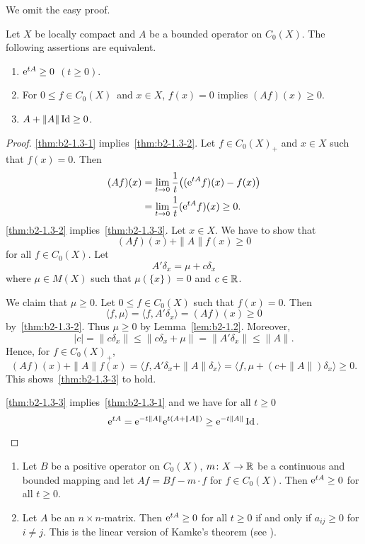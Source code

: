 We omit the easy proof.
\begin{theorem}\label{thm:b2-1.3}
Let $X$ be locally compact and $A$ be a bounded operator on $C_{0}(X)$.
The following assertions are equivalent.
\begin{enumerate}[\upshape (a)]
\item \label{thm:b2-1.3-1}
$\eu^{tA} \geq 0$ $(t \geq 0)$.
\item \label{thm:b2-1.3-2}
For  $0 \leq f \in C_{0}(X)$\, and  $x \in X$,  $f(x) = 0$ implies $(Af)(x) \geq 0$.
\item \label{thm:b2-1.3-3}
$A + \|A\|\Id \geq 0$.
\end{enumerate}
\end{theorem}
\begin{proof}
\ref{thm:b2-1.3-1} implies~\ref{thm:b2-1.3-2}.
Let $f \in C_{0}(X)_{+}$ and $x \in X$ such that $f(x) = 0$.
Then
\begin{align*}
(Af)(x) &= \lim_{t \to 0} \frac{1}{t} \bigl( (\eu^{tA}f)(x) - f(x) \bigr) \\
&= \lim_{t \to 0}\frac{1}{t} (\eu^{tA}f)(x) \geq 0 .
\end{align*}
\ref{thm:b2-1.3-2} implies~\ref{thm:b2-1.3-3}.
Let $x \in X$.
We have to show that 
%
\[
	(Af)(x) + \|A\|f(x) \geq 0
\]
%
for all $f \in C_{0}(X)$.
Let 
%
\[
	A'\delta_{x} = \mu + c\delta_{x}
\]
%
where $\mu \in M(X)$ such that $\mu(\{x\}) = 0$ and $c \in \mathbb{R}$.

We claim that $\mu \geq 0$.
Let $0 \leq f \in C_{0}(X)$ such that $f(x) = 0$.
Then 
%
\[
	\langle f,\mu \rangle = \langle f,A'\delta_{x} \rangle = (Af)(x) \geq 0 
\]
%
by~\ref{thm:b2-1.3-2}.
Thus $\mu \geq 0$ by Lemma~\ref{lem:b2-1.2}.
Moreover, 
%
\[
	|c| = \|c\delta_{x}\| \leq \|c\delta_{x} + \mu\| = \|A'\delta_{x}\| \leq \|A\| .
\]
%
Hence, for $f \in C_{0}(X)_{+}$,
\[
(Af)(x) + \|A\|f(x) = \langle f, A'\delta_{x} + \|A\|\delta_{x} \rangle = \langle f, \mu + (c+\|A\|)\delta_{x} \rangle \geq 0.
\]
This shows~\ref{thm:b2-1.3-3} to hold.

\ref{thm:b2-1.3-3} implies~\ref{thm:b2-1.3-1} and we have for all $t \geq 0$
%
\begin{equation*}
	\eu^{tA} = \eu^{-t\|A\|}\eu^{t(A+\|A\|)} \geq \eu^{-t\|A\|}\Id .
	\qedhere
\end{equation*}
%
\end{proof}
\begin{example}\label{ex:b2-1.4} 
 
\begin{enumerate}[\upshape (i), wide, labelindent=.5ex] 
\item \label{ex:b2-1.4-1}
Let $B$ be a positive operator on $C_{0}(X)$, $m \colon X \to \mathbb{R}$ be a continuous and bounded mapping and let $Af = Bf - m \cdot f$ for $f \in C_{0}(X)$.
Then $\eu^{tA} \geq 0$ for all $t \geq 0$.
		
\item \label{ex:b2-1.4-2}
Let $A$ be an $n \times n$-matrix.
Then $\eu^{tA} \geq 0$ for all $t \geq 0$ if and only if\/ $a_{ij} \geq 0$ for $i \neq j$.
This is the linear version of Kamke's theorem (see \textcite{kamke:1932}).
\end{enumerate}
\end{example}
